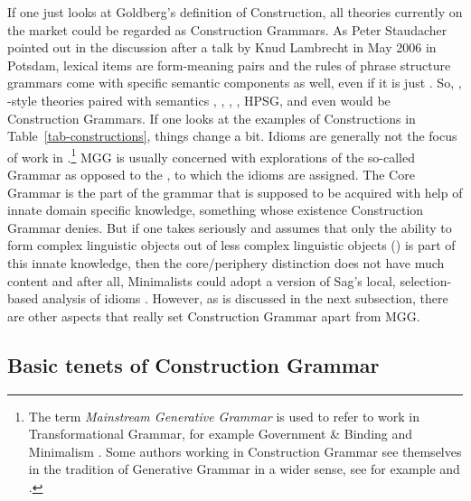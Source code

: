 \documentclass[output=paper
	        ,collection
	        ,collectionchapter
 	        ,biblatex
                ,babelshorthands
                ,newtxmath
                ,draftmode
                ,colorlinks, citecolor=brown
]{langscibook}
\begin{document}
If one just looks at Goldberg's definition of Construction, all theories currently on the market could be
regarded as Construction Grammars. As Peter Staudacher pointed out in the discussion after a talk by
Knud Lambrecht in May 2006 in Potsdam, lexical items are form-meaning pairs and the rules of
phrase structure grammars come with specific semantic components as well, even if it is just
.
So, \cg, -style theories paired with semantics \citep{HK98a-u}, \gpsg, \treeag,
\lfg, HPSG, and even \minimalism would be Construction Grammars. If one looks at the
examples of Constructions in Table~\ref{tab-constructions}, things change a bit. Idioms are generally
not the focus of work in .\footnote{
  The term \emph{Mainstream Generative Grammar} is used to refer to work in Transformational
  Grammar, for example Government \& Binding \citep{Chomsky81a} and Minimalism
  \citep{Chomsky95a-u}. Some authors working in Construction Grammar see themselves in the tradition of
  Generative Grammar in a wider sense, see for example  and .%
} MGG is usually concerned with explorations of the so-called  Grammar as opposed to the , to which the
idioms are assigned.
The Core Grammar is the part of the grammar that is supposed to be acquired with
help of innate domain specific knowledge, something whose existence Construction Grammar
denies. But if one takes \citet*{HCF2002a} seriously and assumes that only the ability to form complex
linguistic objects out of less complex linguistic objects () is part of this innate knowledge,
then the core/periphery distinction does not have much content and after all, Minimalists could adopt
a version of Sag's local, selection-based analysis of idioms \parencites{Sag2007a}{KSF2015a}{KM2019a}.
However, as is discussed in the next subsection, there are other aspects that really set Construction Grammar apart from
MGG.

\subsection{Basic tenets of Construction Grammar}
\label{sec-tenets}
\end{document}

